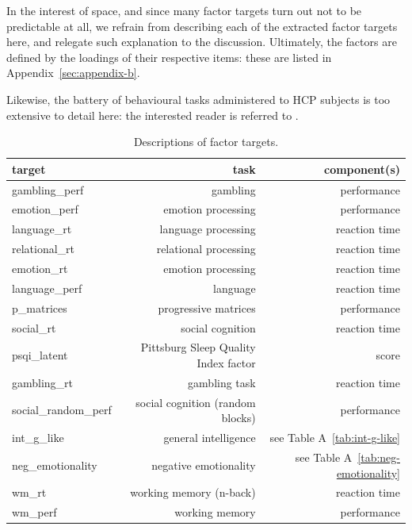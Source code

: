 \documentclass{article}
\begin{document}
%

In the interest of space, and since many factor targets turn out not to be
predictable at all, we refrain from describing each of the extracted factor
targets here, and relegate such explanation to the discussion. Ultimately, the
factors are defined by the loadings of their respective items: these are
listed in Appendix~\ref{sec:appendix-b}.

Likewise, the battery of behavioural tasks administered to HCP subjects is
too extensive to detail here: the interested reader is referred to
\citet{Barch2013}.

\begin{table}
\centering
\begin{tabular}{lrr}
	\toprule
	target & task & component(s)  \\
	\midrule
	gambling\_perf       & gambling              & performance   \\
	emotion\_perf        & emotion processing    & performance   \\
	language\_rt         & language processing   & reaction time \\
	relational\_rt       & relational processing & reaction time \\
	emotion\_rt          & emotion processing    & reaction time \\
	language\_perf       & language              & reaction time \\
	p\_matrices          & progressive matrices  & performance   \\
	social\_rt           & social cognition      & reaction time \\
	psqi\_latent         & Pittsburg Sleep Quality Index factor \citep{buyssePittsburghSleepQuality1989} & score \\
	gambling\_rt         & gambling task         & reaction time \\
	social\_random\_perf & social cognition (random blocks) & performance \\
	int\_g\_like         & general intelligence & see Table A~\ref{tab:int-g-like} \\
	neg\_emotionality    & negative emotionality & see Table A~\ref{tab:neg-emotionality} \\
	wm\_rt               & working memory (n-back) & reaction time \\
	wm\_perf             & working memory          & performance \\
	\bottomrule
\end{tabular}
\footnotesize
\caption{Descriptions of factor targets. } \label{tab:target-descs}
\normalsize
\end{table}
\end{document}
